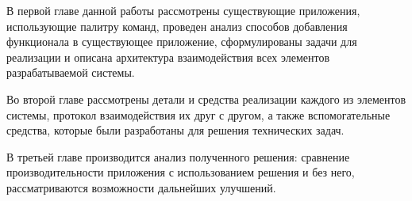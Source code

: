 В первой главе данной работы рассмотрены существующие приложения, использующие
палитру команд, проведен анализ способов добавления функционала в существующее
приложение, сформулированы задачи для реализации и описана архитектура
взаимодействия всех элементов разрабатываемой системы.

Во второй главе рассмотрены детали и средства реализации каждого из элементов
системы, протокол взаимодействия их друг с другом, а также вспомогательные
средства, которые были разработаны для решения технических задач.

В третьей главе производится анализ полученного решения: сравнение
производительности приложения с использованием решения и без него,
рассматриваются возможности дальнейших улучшений.
